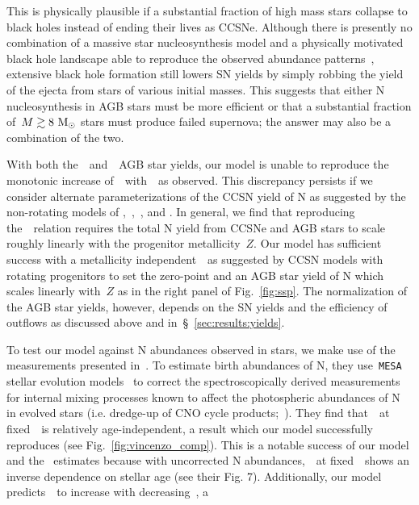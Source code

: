 \documentclass[ms.tex]{subfiles}
\begin{document}
This is physically plausible if a substantial fraction of high mass stars
collapse to black holes instead of ending their lives as CCSNe.
Although there is presently no combination of a massive star nucleosynthesis
model and a physically motivated black hole landscape able to reproduce the
observed abundance patterns~\citep{Griffith2021a}, extensive black hole
formation still lowers SN yields by simply robbing the yield of the ejecta
from stars of various initial masses.
This suggests that either N nucleosynthesis in AGB stars must be more efficient 
or that a substantial fraction of~$M \gtrsim 8~\text{M}_\odot$ stars must produce
failed supernova; the answer may also be a combination of the two.
\par
With both the~\karakasten~and~\karakas~AGB star yields, our model is
unable to reproduce the monotonic increase of~\no~with~\oh~as observed.
This discrepancy persists if we consider alternate parameterizations of the
CCSN yield of N as suggested by the non-rotating models of
\citet{Woosley1995},~\citet{Nomoto2013},~\citet{Sukhbold2016}, and
\citet{Limongi2018}.
In general, we find that reproducing the~\ohno~relation requires the total N
yield from CCSNe and AGB stars to scale roughly linearly with the progenitor
metallicity~$Z$.
Our model has sufficient success with a metallicity independent~~as
suggested by CCSN models with rotating progenitors to set the zero-point and
an AGB star yield of N which scales linearly with~$Z$ as in the right panel of
Fig.~\ref{fig:ssp}.
The normalization of the AGB star yields, however, depends on the SN yields and
the efficiency of outflows as discussed above and
in~\S~\ref{sec:results:yields}.
\par
To test our model against N abundances observed in stars, we make use of the
measurements presented in~\citet{Vincenzo2021}.
To estimate birth abundances of N, they use~\texttt{MESA} stellar evolution
models~\citep{Paxton2011, Paxton2013, Paxton2015, Paxton2018} to correct the
spectroscopically derived measurements for internal mixing processes known to
affect the photospheric abundances of N in evolved stars (i.e. dredge-up of
CNO cycle products;~\citealp{Gilroy1989, Korn2007, Lind2008, Souto2018,
Souto2019}).
They find that~\no~at fixed~\feh~is relatively age-independent, a result
which our model successfully reproduces (see Fig.~\ref{fig:vincenzo_comp}).
This is a notable success of our model and the~\citet{Vincenzo2021} estimates
because with uncorrected N abundances,~\no~at fixed~\feh~shows an inverse
dependence on stellar age (see their Fig. 7).
Additionally, our model predicts~\no~to increase with decreasing~\ofe, a
\end{document}
